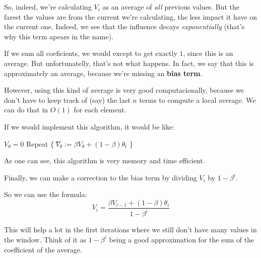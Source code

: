 \documentclass[12pt, a4paper, oneside]{book}
\begin{document}
So, indeed, we're calculating $V_i$ as an average of \textit{all} previous
values. But the farest the values are from the current we're calculating, the
less impact it have on the current one. Indeed, we see that the influence decays
\textit{exponentially} (that's why this term apears in the name).

If we sum all coeficients, we would except to get exactly $1$, since this is an
average. But unfortunatelly, that's not what happens. In fact, we say that this
is approximately an average, because we're missing an \textbf{bias term}.

However, using this kind of average is very good computacionally, because we
don't have to keep track of (say) the last $n$ terms to compute a local average.
We can do that in $O(1)$ for each element.

If we would implement this algorithm, it would be like:

\begin{algorithm}
$V_\theta = 0$ \nl
Repeat \{ \nl
\t $V_\theta := \beta V_\theta + (1-\beta)\theta_t$ \nl
\}
\end{algorithm}

As one can see, this algorithm is very memory and time efficient.

Finally, we can make a correction to the bias term by dividing $V_i$ by
$1-\beta^{i}$.

So we can use the formula:
\[
    V_i = \dfrac{\beta V_{i-1} + (1-\beta)\theta_i}{1-\beta^{i}}
\]

This will help a lot in the first iterations where we still don't have many
values in the window. Think of it as $1-\beta^{i}$ being a good approximation
for the sum of the coefficient of the average.

\end{document}
